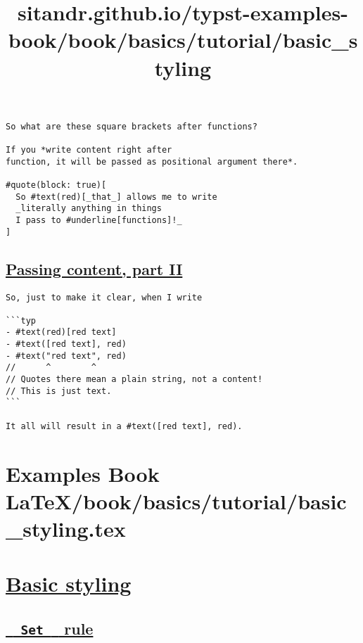 \begin{verbatim}
So what are these square brackets after functions?

If you *write content right after
function, it will be passed as positional argument there*.

#quote(block: true)[
  So #text(red)[_that_] allows me to write
  _literally anything in things
  I pass to #underline[functions]!_
]
\end{verbatim}

\pandocbounded{}

\subsection{\texorpdfstring{\hyperref[passing-content-part-ii]{Passing
content, part
II}}{Passing content, part II}}\label{passing-content-part-ii}

\begin{verbatim}
So, just to make it clear, when I write

```typ
- #text(red)[red text]
- #text([red text], red)
- #text("red text", red)
//      ^        ^
// Quotes there mean a plain string, not a content!
// This is just text.
```

It all will result in a #text([red text], red).
\end{verbatim}

\pandocbounded{}


\section{Examples Book LaTeX/book/basics/tutorial/basic_styling.tex}
\title{sitandr.github.io/typst-examples-book/book/basics/tutorial/basic_styling}

\section{\texorpdfstring{\hyperref[basic-styling]{Basic
styling}}{Basic styling}}\label{basic-styling}

\subsection{\texorpdfstring{\hyperref[set-rule]{\texttt{\ }{\texttt{\ Set\ }}\texttt{\ }
rule}}{  Set   rule}}\label{set-rule}


